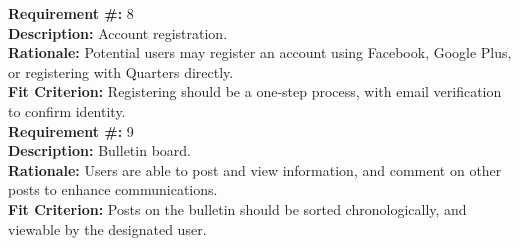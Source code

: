 \documentclass[12pt, titlepage]{article}
\begin{document}
\textbf{Requirement \#:} 8
       \\
      \textbf{Description: }{Account registration.} \\
      \textbf{Rationale: }{Potential users may register an account using 
Facebook, Google Plus, or registering with Quarters directly.} \\
      \textbf{Fit Criterion: }{Registering should be a one-step process, with 
email verification to confirm identity.} \\
        
\textbf{Requirement \#:} 9
      \\
      \textbf{Description: }{Bulletin board.} \\
      \textbf{Rationale: }{Users are able to post and view information, and 
comment on other posts to enhance communications.} \\
      \textbf{Fit Criterion: }{Posts on the bulletin should be sorted 
chronologically, and viewable by the designated user.} \\
        
\end{document}
